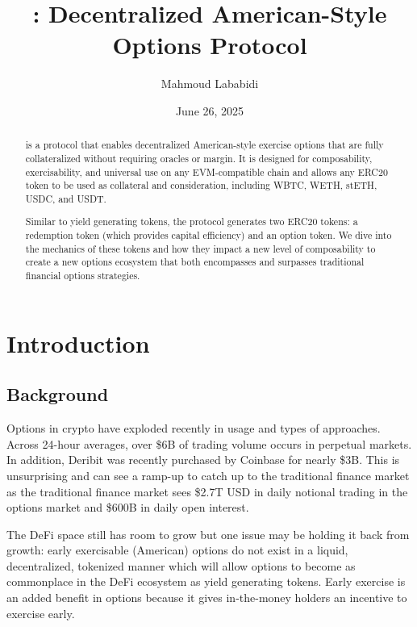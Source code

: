 \title{\greekfi: Decentralized American-Style Options Protocol}

\author{Mahmoud Lababidi}

\date{June 26, 2025}

\begin{abstract}
\greekfi is a protocol that enables decentralized American-style exercise options that are fully collateralized without requiring oracles or margin. 
It is designed for composability, exercisability, and universal use on any EVM-compatible chain and allows any ERC20 token to be used as collateral and consideration, including WBTC, WETH, stETH, USDC, and USDT. 

Similar to yield generating tokens, the protocol generates two ERC20 tokens: a redemption token (which provides capital efficiency) and an option token.
We dive into the mechanics of these tokens and how they impact a new level of composability to create a new options ecosystem that both encompasses and surpasses traditional financial options strategies.


\end{abstract}

\maketitle

\section{\label{sec:introduction}Introduction}

\subsection{Background}
Options in crypto have exploded recently in usage and types of approaches. 
Across 24-hour averages, over \$6B of trading volume occurs in perpetual markets. 
In addition, Deribit was recently purchased by Coinbase for nearly \$3B. 
This is unsurprising and can see a ramp-up to catch up to the traditional finance market as the traditional finance market sees \$2.7T USD in daily notional trading in the options market and \$600B in daily open interest. 

The DeFi space still has room to grow but one issue may be holding it back from growth: early exercisable (American) options do not exist in a liquid, decentralized, tokenized manner which will allow options to become as commonplace in the DeFi ecosystem as yield generating tokens. 
Early exercise is an added benefit in options because it gives in-the-money holders an incentive to exercise early.

